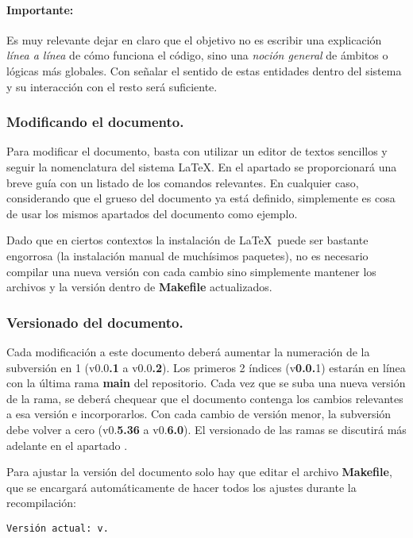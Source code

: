 \paragraph*{Importante:}
Es muy relevante dejar en claro que el objetivo no es escribir una explicación \emph{línea a línea} de cómo funciona el código, sino una \emph{noción general} de ámbitos o lógicas más globales. Con señalar el sentido de estas entidades dentro del sistema y su interacción con el resto será suficiente.

\subsubsection{Modificando el documento.}\label{flujo:modificando-el-documento}
Para modificar el documento, basta con utilizar un editor de textos sencillos y seguir la nomenclatura del sistema \LaTeX. En el apartado  se proporcionará una breve guía con un listado de los comandos relevantes. En cualquier caso, considerando que el grueso del documento ya está definido, simplemente es cosa de usar los mismos apartados del documento como ejemplo.

Dado que en ciertos contextos la instalación de \LaTeX\ puede ser bastante engorrosa (la instalación manual de muchísimos paquetes), no es necesario compilar una nueva versión con cada cambio sino simplemente mantener los archivos  y la versión dentro de \textbf{Makefile} actualizados.

\subsubsection{Versionado del documento.}\label{flujo:versionado-del-documento}
Cada modificación a este documento deberá aumentar la numeración de la subversión en 1 (v0.0\textbf{.1} a v0.0\textbf{.2}). Los primeros 2 índices (v\textbf{0.0.}1) estarán en línea con la última rama \textbf{main} del repositorio. Cada vez que se suba una nueva versión de la rama, se deberá chequear que el documento contenga los cambios relevantes a esa versión e incorporarlos. Con cada cambio de versión menor, la subversión debe volver a cero (v0.\textbf{5.36} a v0.\textbf{6.0}). El versionado de las ramas se discutirá más adelante en el apartado .

Para ajustar la versión del documento solo hay que editar el archivo \textbf{Makefile}, que se encargará automáticamente de hacer todos los ajustes durante la recompilación:
\begin{center}
\texttt{Versión actual: v\docversion.}
\end{center}

